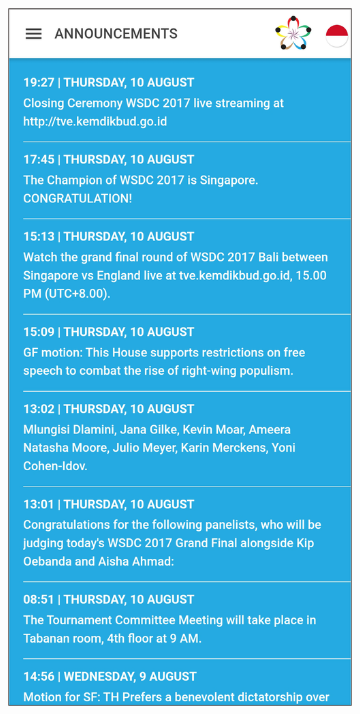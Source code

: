 \begin{figure}[H]
     \centering
     \begin{subfigure}[b]{0.3\textwidth}
         \centering
         \includegraphics[width=\textwidth]{Gambar/SSAnnuncements.png}

\end{subfigure}
\end{figure}

